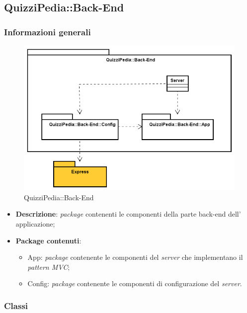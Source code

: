 \subsection{QuizziPedia::Back-End}
\subsubsection{Informazioni generali}
\label{QuizziPedia::Back-End}
\begin{figure}[ht]
	\centering
	\includegraphics[scale=0.45]{UML/Package/QuizziPedia_Back-End.png}
	\caption{QuizziPedia::Back-End}
\end{figure}
\FloatBarrier
	\begin{itemize}
		\item \textbf{Descrizione}:
		\textit{package} contenenti le componenti della parte back-end dell' applicazione;
		\item \textbf{Package contenuti}:
		\begin{itemize}
			\item App:
			\textit{package} contenente le componenti del \textit{server} che implementano il \textit{pattern MVC};
			\item Config:
			\textit{package} contenente le componenti di configurazione del \textit{server}.
		\end{itemize}
	\end{itemize}
\subsubsection{Classi}
